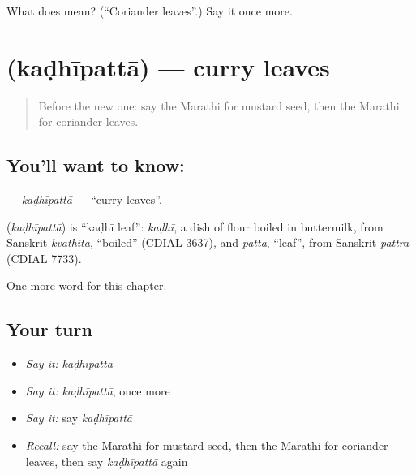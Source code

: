 \begin{tcolorbox}[breakable,colback=teal!4,colframe=teal!35!black,title={Before you move on}]
What does  mean? (\textquotedblleft{}Coriander leaves\textquotedblright{}.) Say it once more.
\end{tcolorbox}
\section[\texorpdfstring{\mr{कढीपत्ता} (kaḍhīpattā)}{कढीपत्ता (kaḍhīpattā)}]{ (kaḍhīpattā) — curry leaves}

\label{lesson:MR-C244-kadhipatta}



\begin{quote}
Before the new one: say the Marathi for mustard seed, then the Marathi for coriander leaves.
\end{quote}

\subsection*{You'll want to know: }
\textbf{} — \emph{kaḍhīpattā} — \textquotedblleft{}curry leaves\textquotedblright{}.

\begin{cousinweb}
\textbf{} (\emph{kaḍhīpattā}) is \textquotedblleft{}kaḍhī leaf\textquotedblright{}: \emph{kaḍhī}, a dish of flour boiled in buttermilk, from Sanskrit \emph{kvathita}, \textquotedblleft{}boiled\textquotedblright{} (CDIAL 3637), and \emph{pattā}, \textquotedblleft{}leaf\textquotedblright{}, from Sanskrit \emph{pattra} (CDIAL 7733).
\end{cousinweb}

\begin{grammarlens}[title={What you've built}]
One more word for this chapter.
\end{grammarlens}

\subsection*{Your turn}
\begin{itemize}
\raggedright
  \item \emph{Say it:} \emph{kaḍhīpattā}
  \item \emph{Say it:} \emph{kaḍhīpattā}, once more
  \item \emph{Say it:} say \emph{kaḍhīpattā}
  \item \emph{Recall:} say the Marathi for mustard seed, then the Marathi for coriander leaves, then say \emph{kaḍhīpattā} again
\end{itemize}

